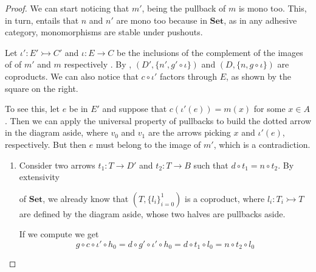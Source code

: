 \documentclass[a4paper,UKenglish,cleveref,pdftex,thm-restate,numberwithinsect]{lipics-v2021}
\newcommand{\Set}{\mathbf{Set}}
\newcommand{\mto}{\rightarrowtail}
\begin{document}
\begin{proof}\label{proof:kerset}
	We can start noticing that $m'$, being the pullback of $m$ is mono too. This, in turn, entails that $n$ and $n'$ are mono too because in $\Set$, as in any adhesive category, monomorphisms are stable under pushouts.  
	
	\noindent 
	\parbox{11.5cm}{\hspace{15pt}
	Let $\iota' \colon E'\mto C'$ and $\iota\colon E\to C$ be the inclusions of the complement of the images of of $m'$ and $m$ respectively . By , $(D', \{n', g'\circ \iota\})$ and $(D, \{n, g\circ \iota\})$ are coproducts. We can also notice that $c\circ \iota'$ factors through $E$, as shown by the square on the right.}\hfill \parbox{4cm}{\vspace{-5pt}}
	
	\noindent
	\parbox{10.5cm}{\hspace{15pt}To see this, let $e$ be in $E'$ and suppose that  $c(\iota'(e))=m(x)$ for some $x\in A$. Then we can apply the  universal property of pullbacks to build the dotted arrow in the diagram aside, where $v_0$ and $v_1$ are the arrows picking $x$ and $\iota'(e)$, respectively. But then $e$ must belong to the image of $m'$, which is a contradiction.}\hfill  \parbox{4cm}{}
	
	
	\begin{enumerate}
		\item Consider two arrows $t_1\colon T\to D' $ and $t_2\colon T\to B$ such that $d\circ t_1=n\circ t_2$. By extensivity
		
		\noindent\parbox{9.5cm}{ of $\Set$, we already know that $(T, \{l_i\}_{i=0}^1)$ is a coproduct, where $l_i\colon T_i\mto T$ are defined by the diagram aside, whose two halves are pullbacks aside. }\hfill\parbox{4cm}{}
		
		If we compute we get
		\[g\circ c \circ \iota' \circ h_0=d\circ g'\circ \iota' \circ h_0=d\circ t_1\circ l_0=n\circ t_2\circ l_0\]
		

\end{enumerate}
\end{proof}
\end{document}
